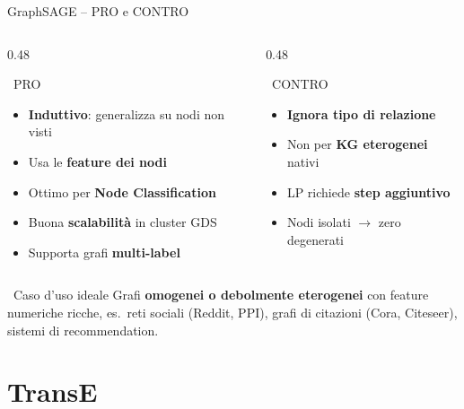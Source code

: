 \documentclass[aspectratio=169]{beamer}
\newcommand{\icoThumb}{\faThumbsUp}
\newcommand{\icoWarn}{\faExclamationTriangle}
\newcommand{\icoIdea}{\faLightbulb}
\newcommand{\icoCheck}{\faCheckCircle}
\newcommand{\icoX}{\faTimesCircle}
\newcommand{\icoThumb}{\textbf{+}}
\newcommand{\icoWarn}{\textbf{!}}
\newcommand{\icoIdea}{\textbf{$\bigstar$}}
\newcommand{\icoCheck}{\ding{52}}
\newcommand{\icoX}{\ding{56}}
\newcommand{\pro}{{\color{successGreen}\icoCheck}}
\newcommand{\con}{{\color{warningRed}\icoX}}
\begin{document}
\begin{frame}{GraphSAGE -- PRO e CONTRO}
  \begin{columns}[T]
    \begin{column}{0.48\textwidth}
      \begin{block}{\icoThumb\ PRO}
        \footnotesize
        \begin{itemize}
          \setlength{\itemsep}{1pt}
          \setlength{\parskip}{0pt}
          \item[\pro] \textbf{Induttivo}: generalizza su nodi non visti
          \item[\pro] Usa le \textbf{feature dei nodi}
          \item[\pro] Ottimo per \textbf{Node Classification}
          \item[\pro] Buona \textbf{scalabilit\`a} in cluster GDS
          \item[\pro] Supporta grafi \textbf{multi-label}
        \end{itemize}
      \end{block}
    \end{column}
    \begin{column}{0.48\textwidth}
      \begin{alertblock}{\icoWarn\ CONTRO}
        \footnotesize
        \begin{itemize}
          \setlength{\itemsep}{1pt}
          \setlength{\parskip}{0pt}
          \item[\con] \textbf{Ignora tipo di relazione}
          \item[\con] Non per \textbf{KG eterogenei} nativi
          \item[\con] LP richiede \textbf{step aggiuntivo}
          \item[\con] Nodi isolati $\to$ zero degenerati
        \end{itemize}
      \end{alertblock}
    \end{column}
  \end{columns}
  \vspace{-0.1cm}
  \begin{exampleblock}{\icoIdea\ Caso d'uso ideale}
    \footnotesize
    Grafi \textbf{omogenei o debolmente eterogenei} con feature numeriche ricche,
    es.\ reti sociali (Reddit, PPI), grafi di citazioni (Cora, Citeseer),
    sistemi di recommendation.
  \end{exampleblock}
\end{frame}

\section{TransE}
\end{document}

